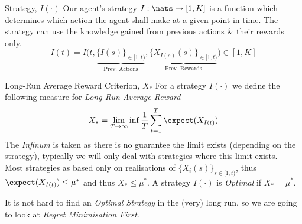 \documentclass[11pt,a4paper]{article}
\begin{document}
\begin{definition}{Strategy, $I(\cdot)$}
  Our agent's strategy $I:\nats\to[1,K]$ is a function which determines which action the agent shall make at a given point in time. The strategy can use the knowledge gained from previous actions \& their rewards only.
  \[ I(t)=I\big(t,\underbrace{\{I(s)\}_{\in[1,t)}}_\text{Prev. Actions},\underbrace{\{X_{I(s)}(s)\}_{\in[1,t)}}_\text{Prev. Rewards}\big)\in[1,K] \]
\end{definition}

\begin{definition}{Long-Run Average Reward Criterion, $X_*$}
  For a strategy $I(\cdot)$ we define the following measure for \textit{Long-Run Average Reward}
  \[ {\displaystyle X_*=\lim_{T\to\infty}\inf\frac1T\sum_{t=1}^T\expect(X_{I(t)})} \]
  The \textit{Infinum} is taken as there is no guarantee the limit exists (depending on the strategy), typically we will only deal with strategies where this limit exists.\\
  Most strategies as based only on realisations of $\{X_i(s)\}_{s\in[1,t)}$, thus $\expect(X_{I(t)})\leq\mu^*$ and thus $X_*\leq\mu^*$. A strategy $I(\cdot)$ is \textit{Optimal} if $X_*=\mu^*$.
\end{definition}

\begin{remark}{It is not hard to find an \textit{Optimal Strategy} in the (very) long run, so we are going to look at \textit{Regret Minimisation First}.}
\end{remark}
\end{document}
